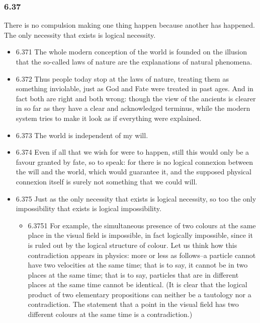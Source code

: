\documentclass[11pt]{article}
\begin{document}
\subsubsection*{6.37}
\label{sec:org425280b}
There is no compulsion making one thing happen because another has
happened. The only necessity that exists is logical necessity.
\begin{itemize}
\item 6.371
\label{sec:org19f019d}
The whole modern conception of the world is founded on the illusion
that the so-called laws of nature are the explanations of natural
phenomena.
\item 6.372
\label{sec:orgf755ae8}
Thus people today stop at the laws of nature, treating them as
something inviolable, just as God and Fate were treated in past ages. And
in fact both are right and both wrong: though the view of the ancients is
clearer in so far as they have a clear and acknowledged terminus, while the
modern system tries to make it look as if everything were explained.
\item 6.373
\label{sec:org213a8f6}
The world is independent of my will.
\item 6.374
\label{sec:org1f7994c}
Even if all that we wish for were to happen, still this would only be
a favour granted by fate, so to speak: for there is no logical connexion
between the will and the world, which would guarantee it, and the supposed
physical connexion itself is surely not something that we could will.
\item 6.375
\label{sec:org2c9b6a3}
Just as the only necessity that exists is logical necessity, so too
the only impossibility that exists is logical impossibility.
\begin{itemize}
\item 6.3751
\label{sec:orgeba93fe}
For example, the simultaneous presence of two colours at the same
place in the visual field is impossible, in fact logically impossible,
since it is ruled out by the logical structure of colour. Let us think how
this contradiction appears in physics: more or less as follows--a particle
cannot have two velocities at the same time; that is to say, it cannot be
in two places at the same time; that is to say, particles that are in
different places at the same time cannot be identical. (It is clear that
the logical product of two elementary propositions can neither be a
tautology nor a contradiction. The statement that a point in the visual
field has two different colours at the same time is a contradiction.)
\end{itemize}
\end{itemize}
\end{document}
